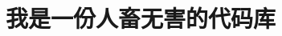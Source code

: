 \documentclass[9pt]{article}
\begin{document}
\title{\bf 我是一份人畜无害的代码库}
\date{}

\maketitle

\begin{multicols}{2}
\tableofcontents
\end{multicols}

\newpage

\columnseprule=0.25pt

\begin{multicols}{2}


\end{multicols}
\end{document}
